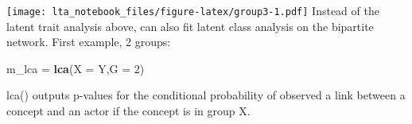 \documentclass[
]{article}
\newenvironment{Shaded}{\begin{snugshade}}{\end{snugshade}}
\newcommand{\DataTypeTok}[1]{\textcolor[rgb]{0.13,0.29,0.53}{#1}}
\newcommand{\DecValTok}[1]{\textcolor[rgb]{0.00,0.00,0.81}{#1}}
\newcommand{\KeywordTok}[1]{\textcolor[rgb]{0.13,0.29,0.53}{\textbf{#1}}}
\newcommand{\NormalTok}[1]{#1}
\newcommand{\OperatorTok}[1]{\textcolor[rgb]{0.81,0.36,0.00}{\textbf{#1}}}
\newcommand{\StringTok}[1]{\textcolor[rgb]{0.31,0.60,0.02}{#1}}
\begin{document}
\begin{Shaded}
\end{Shaded}

\texttt{[image: lta\_notebook\_files/figure-latex/group3-1.pdf]} Instead
of the latent trait analysis above, can also fit latent class analysis
on the bipartite network. First example, 2 groups:

\begin{Shaded}
\begin{Highlighting}[]
\NormalTok{m_lca =}\StringTok{ }\KeywordTok{lca}\NormalTok{(}\DataTypeTok{X =}\NormalTok{ Y,}\DataTypeTok{G =} \DecValTok{2}\NormalTok{)}
\end{Highlighting}
\end{Shaded}

lca() outputs p-values for the conditional probability of observed a
link between a concept and an actor if the concept is in group X.

\begin{Shaded}
\end{Shaded}
\end{document}
